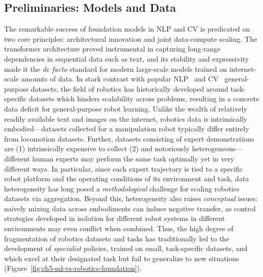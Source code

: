 \subsection{Preliminaries: Models and Data}
The remarkable success of foundation models in NLP and CV is predicated on two core principles: architectural innovation and joint data-compute scaling.
The transformer architecture proved instrumental in capturing long-range dependencies in sequential data such as text, and its stability and expressivity made it the \emph{de facto} standard for modern large-scale models trained on internet-scale amounts of data.
In stark contrast with popular NLP~\citep{raffelExploringLimitsTransfer2023} and CV~\citep{ImageNet_VSS09} general-purpose datasets, the field of robotics has historically developed around task-specific datasets which hinders scalability across problems, resulting in a concrete data deficit for general-purpose robot learning.
Unlike the wealth of relatively readily available text and images on the internet, robotics data is intrinsically embodied---datasets collected for a manipulation robot typically differ entirely from locomotion datasets.
Further, datasets consisting of expert demonstrations are (1) intrinsically expensive to collect (2) and notoriously heterogeneous---different human experts may perform the same task optimally yet in very different ways.
In particular, since each expert trajectory is tied to a specific robot platform and the operating conditions of its environment and task, data heterogeneity has long posed a \emph{methodological} challenge for scaling robotics datasets via aggregation. 
Beyond this, heterogeneity also raises \emph{conceptual} issues: naively mixing data across embodiments can induce negative transfer, as control strategies developed in isolation for different robot systems in different environments may even conflict when combined.
Thus, the high degree of fragmentation of robotics datasets and tasks has traditionally led to the development of \emph{specialist} policies, trained on small, task-specific datasets, and which excel at their designated task but fail to generalize to new situations (Figure~\ref{fig:ch5-ml-vs-robotics-foundation}).

